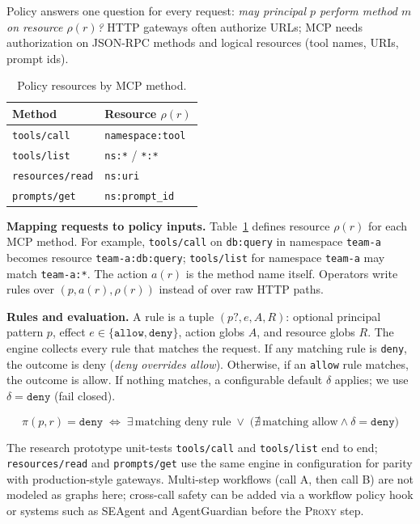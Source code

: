 \documentclass[11pt]{article}
\newcommand{\code}[1]{\texttt{#1}}
\newcommand{\seagent}{SEAgent}
\newcommand{\agentguardian}{AgentGuardian}
\begin{document}
Policy answers one question for every request: \emph{may principal $p$ perform method $m$ on resource $\rho(r)$?}
HTTP gateways often authorize URLs; MCP needs authorization on JSON-RPC methods and logical resources (tool names, URIs, prompt ids).

\begin{table}[H]
\centering
\caption{Policy resources by MCP method.}
\label{tab:policy-map}
\small
\begin{tabular}{@{}ll@{}}
\toprule
Method & Resource $\rho(r)$ \\
\midrule
\code{tools/call} & \code{namespace:tool} \\
\code{tools/list} & \code{ns:*} / \code{*:*} \\
\code{resources/read} & \code{ns:uri} \\
\code{prompts/get} & \code{ns:prompt\_id} \\
\bottomrule
\end{tabular}
\end{table}

\textbf{Mapping requests to policy inputs.}
Table~\ref{tab:policy-map} defines resource $\rho(r)$ for each MCP method.
For example, \code{tools/call} on \code{db:query} in namespace \code{team-a} becomes resource \code{team-a:db:query}; \code{tools/list} for namespace \code{team-a} may match \code{team-a:*}.
The action $a(r)$ is the method name itself.
Operators write rules over $(p, a(r), \rho(r))$ instead of over raw HTTP paths.

\textbf{Rules and evaluation.}
A rule is a tuple $(p?, e, A, R)$: optional principal pattern $p$, effect $e \in \{\texttt{allow},\texttt{deny}\}$, action globs $A$, and resource globs $R$.
The engine collects every rule that matches the request.
If any matching rule is \texttt{deny}, the outcome is deny (\emph{deny overrides allow}).
Otherwise, if an \texttt{allow} rule matches, the outcome is allow.
If nothing matches, a configurable default $\delta$ applies; we use $\delta=\texttt{deny}$ (fail closed).

\begin{equation}
\label{eq:policy}
\pi(p,r) = \texttt{deny} \;\Leftrightarrow\; \exists\,\text{matching deny rule}
\;\lor\; \big(\nexists\,\text{matching allow} \land \delta{=}\texttt{deny}\big)
\end{equation}

The research prototype unit-tests \code{tools/call} and \code{tools/list} end to end; \code{resources/read} and \code{prompts/get} use the same engine in configuration for parity with production-style gateways.
Multi-step workflows (call A, then call B) are not modeled as graphs here; cross-call safety can be added via a workflow policy hook or systems such as \seagent{} and \agentguardian{} before the \textsc{Proxy} step.
\end{document}
